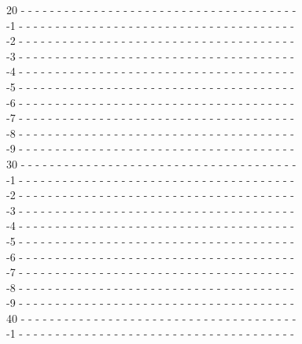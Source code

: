 {\begin{flushleft}
20 - - - - - - - - - - - - - - - - - - - - - - - - - - - - - - - - - - - - - -\\
-1 - - - - - - - - - - - - - - - - - - - - - - - - - - - - - - - - - - - - - -\\
-2 - - - - - - - - - - - - - - - - - - - - - - - - - - - - - - - - - - - - - -\\
-3 - - - - - - - - - - - - - - - - - - - - - - - - - - - - - - - - - - - - - -\\
-4 - - - - - - - - - - - - - - - - - - - - - - - - - - - - - - - - - - - - - -\\
-5 - - - - - - - - - - - - - - - - - - - - - - - - - - - - - - - - - - - - - -\\
-6 - - - - - - - - - - - - - - - - - - - - - - - - - - - - - - - - - - - - - -\\
-7 - - - - - - - - - - - - - - - - - - - - - - - - - - - - - - - - - - - - - -\\
-8 - - - - - - - - - - - - - - - - - - - - - - - - - - - - - - - - - - - - - -\\
-9 - - - - - - - - - - - - - - - - - - - - - - - - - - - - - - - - - - - - - -\\
30 - - - - - - - - - - - - - - - - - - - - - - - - - - - - - - - - - - - - - -\\
-1 - - - - - - - - - - - - - - - - - - - - - - - - - - - - - - - - - - - - - -\\
-2 - - - - - - - - - - - - - - - - - - - - - - - - - - - - - - - - - - - - - -\\
-3 - - - - - - - - - - - - - - - - - - - - - - - - - - - - - - - - - - - - - -\\
-4 - - - - - - - - - - - - - - - - - - - - - - - - - - - - - - - - - - - - - -\\
-5 - - - - - - - - - - - - - - - - - - - - - - - - - - - - - - - - - - - - - -\\
-6 - - - - - - - - - - - - - - - - - - - - - - - - - - - - - - - - - - - - - -\\
-7 - - - - - - - - - - - - - - - - - - - - - - - - - - - - - - - - - - - - - -\\
-8 - - - - - - - - - - - - - - - - - - - - - - - - - - - - - - - - - - - - - -\\
-9 - - - - - - - - - - - - - - - - - - - - - - - - - - - - - - - - - - - - - -\\
40 - - - - - - - - - - - - - - - - - - - - - - - - - - - - - - - - - - - - - -\\
-1 - - - - - - - - - - - - - - - - - - - - - - - - - - - - - - - - - - - - - -\\

\end{flushleft}}
